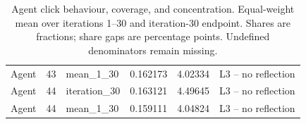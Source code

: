 \begin{table}[htbp!]
\begin{tabular}{lrlrrl}
Agent & 43 & mean\_1\_30 & 0.162173 & 4.02334 & L3 -- no reflection \\
Agent & 44 & iteration\_30 & 0.163121 & 4.49645 & L3 -- no reflection \\
Agent & 44 & mean\_1\_30 & 0.159111 & 4.04824 & L3 -- no reflection \\
\hline
\end{tabular}
\caption{Agent click behaviour, coverage, and concentration. Equal-weight mean over iterations 1--30 and iteration-30 endpoint. Shares are fractions; share gaps are percentage points. Undefined denominators remain missing.}
\label{chap:results:tab:rq3_agents_rank_statistics}
\end{table}
